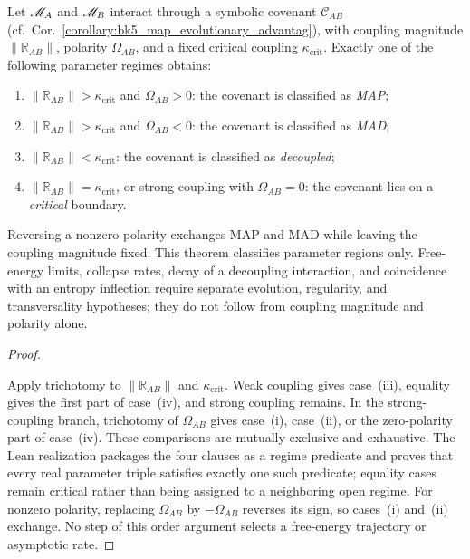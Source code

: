 \begin{theorem}
\label{theorem:bk5_enhanced_map_mad_duality}
Let $\mathscr{M}_A$ and $\mathscr{M}_B$ interact through a symbolic covenant
$\mathcal C_{AB}$ (cf.~Cor.~\ref{corollary:bk5_map_evolutionary_advantag}),
with coupling magnitude $\|\mathbb R_{AB}\|$, polarity $\Omega_{AB}$, and a
fixed critical coupling $\kappa_{\mathrm{crit}}$.  Exactly one of the following
parameter regimes obtains:
\begin{enumerate}
  \item[(i)] $\|\mathbb R_{AB}\|>\kappa_{\mathrm{crit}}$ and
    $\Omega_{AB}>0$: the covenant is classified as \emph{MAP};
  \item[(ii)] $\|\mathbb R_{AB}\|>\kappa_{\mathrm{crit}}$ and
    $\Omega_{AB}<0$: the covenant is classified as \emph{MAD};
  \item[(iii)] $\|\mathbb R_{AB}\|<\kappa_{\mathrm{crit}}$: the covenant is
    classified as \emph{decoupled};
  \item[(iv)] $\|\mathbb R_{AB}\|=\kappa_{\mathrm{crit}}$, or strong coupling
    with $\Omega_{AB}=0$: the covenant lies on a \emph{critical} boundary.
\end{enumerate}
Reversing a nonzero polarity exchanges MAP and MAD while leaving the coupling
magnitude fixed.  This theorem classifies parameter regions only.  Free-energy
limits, collapse rates, decay of a decoupling interaction, and coincidence with
an entropy inflection require separate evolution, regularity, and transversality
hypotheses; they do not follow from coupling magnitude and polarity alone.
\end{theorem}
\begin{proof}
\label{proof:bk5_enhanced_map_mad_duality}
\leavevmode

Apply trichotomy to $\|\mathbb R_{AB}\|$ and
$\kappa_{\mathrm{crit}}$.  Weak coupling gives case~(iii), equality gives the
first part of case~(iv), and strong coupling remains.  In the strong-coupling
branch, trichotomy of $\Omega_{AB}$ gives case~(i), case~(ii), or the zero-polarity
part of case~(iv).  These comparisons are mutually exclusive and exhaustive.  The Lean realization
packages the four clauses as a regime predicate and proves that every real
parameter triple satisfies exactly one such predicate; equality cases remain
critical rather than being assigned to a neighboring open regime.
For nonzero polarity, replacing $\Omega_{AB}$ by $-\Omega_{AB}$ reverses its
sign, so cases~(i) and~(ii) exchange.  No step of this order argument selects a
free-energy trajectory or asymptotic rate.
\end{proof}
